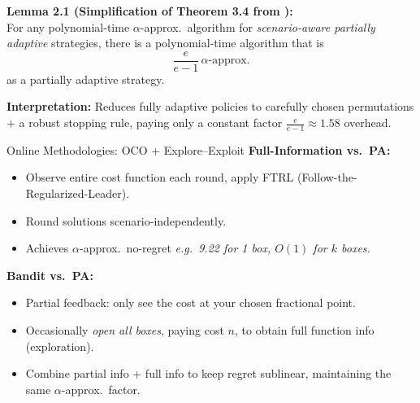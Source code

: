 \documentclass{beamer}
\begin{document}
    \begin{frame}
    \vspace{0.5em}
    \textbf{Lemma 2.1 (Simplification of Theorem 3.4 from \cite{CGT+20}):}\\
    For any polynomial-time $\alpha$-approx.\ algorithm for \emph{scenario-aware partially adaptive} strategies, there is a polynomial-time algorithm that is 
    \[
     \frac{e}{e-1}\,\alpha\text{-approx.}
    \]
    as a partially adaptive strategy. 
    
    \textbf{Interpretation:} Reduces fully adaptive policies to carefully chosen permutations $+$ a robust stopping rule, paying only a constant factor $\frac{e}{e-1}\approx 1.58$ overhead.
    \end{frame}
    
    \begin{frame}{Online Methodologies: OCO + Explore--Exploit}
    \textbf{Full-Information vs.\ PA:}
    \begin{itemize}
      \item Observe entire cost function each round, apply FTRL (Follow-the-Regularized-Leader).
      \item Round solutions scenario-independently.
      \item Achieves $\alpha$-approx.\ no-regret \emph{e.g.\ 9.22 for 1 box, $O(1)$ for $k$ boxes.}
    \end{itemize}
    
    \textbf{Bandit vs.\ PA:}
    \begin{itemize}
      \item Partial feedback: only see the cost at your chosen fractional point.
      \item Occasionally \emph{open all boxes}, paying cost $n$, to obtain full function info (exploration).
      \item Combine partial info + full info to keep regret sublinear, maintaining the same $\alpha$-approx.\ factor.
    \end{itemize}
    \end{frame}
    
\end{document}
